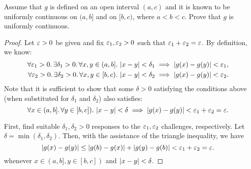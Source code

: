 \begin{problem}
  Assume that $g$ is defined on an open interval $(a, c)$ and it is known to be
  uniformly continuous on $(a, b]$ and on $[b, c)$, where $a < b < c$. Prove
  that $g$ is uniformly continuous.

  \begin{proof}
    Let $\varepsilon > 0$ be given and fix $\varepsilon_{1}, \varepsilon_{2} > 0$ such that
    $\varepsilon_{1} + \varepsilon_{2} = \varepsilon$. By definition, 
    we know:
    \begin{align*}
      \forall \varepsilon_{1} > 0.\, \exists \delta_{1} > 0.\, \forall x, y \in (a, b].\, \left\lvert x - y \right\rvert < \delta_{1} \implies \left\lvert g(x) - g(y) \right\rvert < \varepsilon_{1},\\
      \forall \varepsilon_{2} > 0.\, \exists \delta_{2} > 0.\, \forall x, y \in [b, c).\, \left\lvert x - y \right\rvert < \delta_{2} \implies \left\lvert g(x) - g(y) \right\rvert < \varepsilon_{2}.
    \end{align*}
    Note that it is sufficient to show that some $\delta > 0$ satisfying the
    conditions above (when substituted for $\delta_{1}$ and $\delta_{2}$)
    also satisfies:
    \[
      \forall x \in (a, b].\, \forall y \in [b, c]).\, \left\lvert x - y \right\rvert < \delta \implies \left\lvert g(x) - g(y) \right\rvert < \varepsilon_{1} + \varepsilon_{2} = \varepsilon.
    \]

    First, find suitable $\delta_{1}, \delta_{2} > 0$ responses to the
    $\varepsilon_{1}, \varepsilon_{2}$ challenges, respectively. Let $\delta =
    \min{(\delta_{1}, \delta_{2})}$. Then, with the assistance
    of the triangle inequality, we have
    \[
      \left\lvert g(x) - g(y) \right\rvert \leq \left\lvert g(b) - g(x) \right\rvert + \left\lvert g(y) - g(b) \right\rvert < \varepsilon_{1} + \varepsilon_{2} = \varepsilon.
    \]
    whenever $x \in (a, b], y \in [b, c])$ and $\left\lvert x - y \right\rvert < \delta$.
  \end{proof}
\end{problem}

